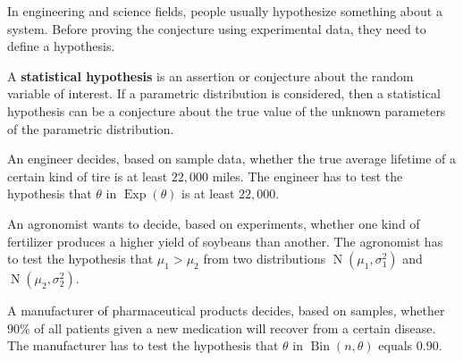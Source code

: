 \documentclass{huhtakm-template-book-v2}
\DeclareMathOperator{\Bin}{Bin}
\DeclareMathOperator{\Exp}{Exp}
\DeclareMathOperator{\N}{N}
\begin{document}
    In engineering and science fields, people usually hypothesize something about a system. Before proving the conjecture using experimental data, they need to define a hypothesis.
    \begin{defn}
        A \textbf{statistical hypothesis} is an assertion or conjecture about the random variable of interest. If a parametric distribution is considered, then a statistical hypothesis can be a conjecture about the true value of the unknown parameters of the parametric distribution.
    \end{defn}
    \begin{eg}
        \label{Chapter 4 (Example) Engineer example}
        An engineer decides, based on sample data, whether the true average lifetime of a certain kind of tire is at least $22,000$ miles. The engineer has to test the hypothesis that $\theta$ in $\Exp(\theta)$ is at least $22,000$.
    \end{eg}
    \begin{eg}
        An agronomist wants to decide, based on experiments, whether one kind of fertilizer produces a higher yield of soybeans than another. The agronomist has to test the hypothesis that $\mu_{1}>\mu_{2}$ from two distributions $\N(\mu_{1},\sigma_{1}^{2})$ and $\N(\mu_{2},\sigma_{2}^{2})$.
    \end{eg}
    \begin{eg}
        \label{Chapter 4 (Example) Manufacturer example}
        A manufacturer of pharmaceutical products decides, based on samples, whether $90\%$ of all patients given a new medication will recover from a certain disease. The manufacturer has to test the hypothesis that $\theta$ in $\Bin(n,\theta)$ equals $0.90$.
    \end{eg}
\end{document}
